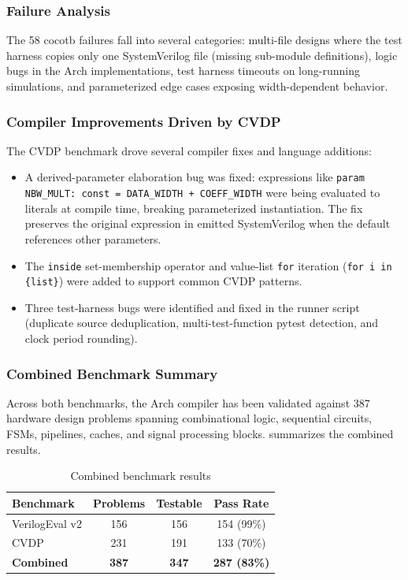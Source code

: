 \documentclass[11pt,twocolumn]{article}
\begin{document}
\subsubsection{Failure Analysis}

The 58 cocotb failures fall into several categories: multi-file designs where the test harness copies only one SystemVerilog file (missing sub-module definitions), logic bugs in the Arch implementations, test harness timeouts on long-running simulations, and parameterized edge cases exposing width-dependent behavior.

\subsubsection{Compiler Improvements Driven by CVDP}

The CVDP benchmark drove several compiler fixes and language additions:

\begin{itemize}
\item A derived-parameter elaboration bug was fixed: expressions like \texttt{param NBW\_MULT: const = DATA\_WIDTH + COEFF\_WIDTH} were being evaluated to literals at compile time, breaking parameterized instantiation. The fix preserves the original expression in emitted SystemVerilog when the default references other parameters.
\item The \texttt{inside} set-membership operator and value-list \texttt{for} iteration (\texttt{for i in \{list\}}) were added to support common CVDP patterns.
\item Three test-harness bugs were identified and fixed in the runner script (duplicate source deduplication, multi-test-function pytest detection, and clock period rounding).
\end{itemize}

\subsubsection{Combined Benchmark Summary}

Across both benchmarks, the Arch compiler has been validated against 387 hardware design problems spanning combinational logic, sequential circuits, FSMs, pipelines, caches, and signal processing blocks.  summarizes the combined results.

\begin{table}[t]
\centering
\caption{Combined benchmark results}
\label{tab:combined}
\footnotesize
\begin{tabular}{@{}lccc@{}}
\toprule
\textbf{Benchmark} & \textbf{Problems} & \textbf{Testable} & \textbf{Pass Rate} \\
\midrule
VerilogEval v2 & 156 & 156 & 154 (99\%) \\
CVDP & 231 & 191 & 133 (70\%) \\
\midrule
\textbf{Combined} & \textbf{387} & \textbf{347} & \textbf{287 (83\%)} \\
\bottomrule
\end{tabular}
\end{table}
\end{document}
